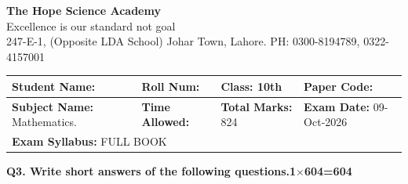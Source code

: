 \documentclass[11pt,a4paper]{article}
\begin{document}
\begin{center}
  {\Huge\bfseries The Hope Science Academy}\\[3pt]
  {\small Excellence is our standard not goal}\\[2pt]
  {\small 247-E-1, (Opposite LDA School) Johar Town, Lahore. PH: 0300-8194789, 0322-4157001}
\end{center}
\medskip\noindent
\begin{tabularx}{\linewidth}{|X|X|X|X|}
\hline
\textbf{Student Name:} & \textbf{Roll Num:} & \textbf{Class:} 10th & \textbf{Paper Code:} \\ \hline
\textbf{Subject Name:} Mathematics. & \textbf{Time Allowed:} & \textbf{Total Marks:} 824 & \textbf{Exam Date:} 09-Oct-2026 \\ \hline
\multicolumn{4}{|l|}{\textbf{Exam Syllabus:} FULL BOOK} \\ \hline
\end{tabularx}
\bigskip
\noindent\textbf{Q3. Write short answers of the following questions.}\hfill\textbf{1$\times$604=604}
\end{document}
